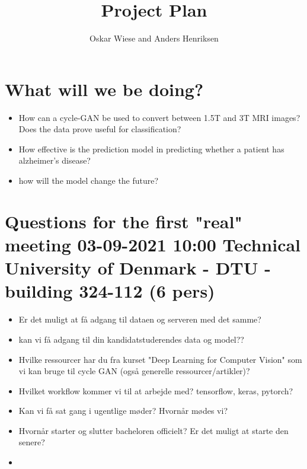 \documentclass[]{article}
\title{Project Plan}
\author{Oskar Wiese and Anders Henriksen}
\begin{document}
\maketitle

\section{What will we be doing?}
\begin{itemize}
	\item How can a cycle-GAN be used to convert between 1.5T and 3T MRI images? Does the data prove useful for classification?
	\item How effective is the prediction model in predicting whether a patient has alzheimer's disease?
	\item how will the model change the future?
\end{itemize}

\section{Questions for the first "real" meeting 03-09-2021 10:00 Technical University of Denmark - DTU - building 324-112 (6 pers)}
\begin{itemize}
	\item Er det muligt at få adgang til dataen og serveren med det samme?
	\item kan vi få adgang til din kandidatstuderendes data og model??
	\item Hvilke ressourcer har du fra kurset "Deep Learning for Computer Vision" som vi kan bruge til cycle GAN (også generelle ressourcer/artikler)? 
	\item Hvilket workflow kommer vi til at arbejde med? tensorflow, keras, pytorch?
	\item Kan vi få sat gang i ugentlige møder? Hvornår mødes vi?
	\item Hvornår starter og slutter bacheloren officielt? Er det muligt at starte den senere?
	\item 
\end{itemize}
\end{document}
